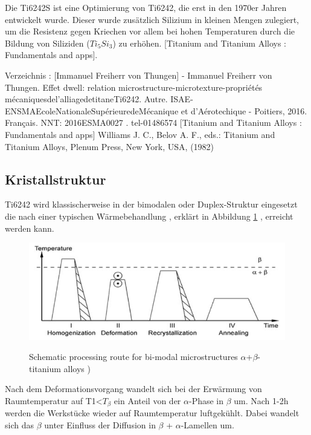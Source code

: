 Die Ti6242S ist eine Optimierung von Ti6242, die erst in den 1970er Jahren  entwickelt wurde. Dieser wurde zusätzlich Silizium in kleinen Mengen zulegiert, um die Resistenz gegen Kriechen vor allem bei hohen Temperaturen durch die Bildung von Siliziden ($Ti_5Si_3$) zu erhöhen.  [Titanium and Titanium Alloys : Fundamentals and apps]. 

Verzeichnis : [Immanuel Freiherr von Thungen] - Immanuel Freiherr von Thungen. Effet dwell: relation microstructure-microtexture-propriétés mécaniquesdel’alliagedetitaneTi6242. Autre. ISAE-ENSMAEcoleNationaleSupérieuredeMécanique et d’Aérotechique - Poitiers, 2016. Français. NNT: 2016ESMA0027 .  tel-01486574
[Titanium and Titanium Alloys : Fundamentals and apps] Williams J. C., Belov A. F., eds.: Titanium and Titanium Alloys, Plenum Press, New York, USA, (1982) 


\subsection{Kristallstruktur}

Ti6242 wird klassischerweise in der bimodalen oder Duplex-Struktur eingesetzt die nach einer typischen Wärmebehandlung , erklärt in Abbildung \ref{WB} , erreicht  werden kann.

\begin{figure}[H]
	
	\centering
	
	{\includegraphics[width=1\textwidth]{Bilder/WB}}			
	\caption{Schematic processing route for bi-modal microstructures $\alpha$+$\beta$-titanium alloys )}
	\label{WB}
\end{figure}
Nach dem Deformationsvorgang wandelt sich bei der Erwärmung von Raumtemperatur  auf \hspace{1ex} T1<$T_{\beta}$  ein Anteil von der $\alpha$-Phase in $\beta$ um. Nach 1-2h werden die Werkstücke wieder auf Raumtemperatur luftgekühlt.
Dabei wandelt sich das $\beta$ unter Einfluss der Diffusion in $\beta$ + $\alpha$-Lamellen um.

